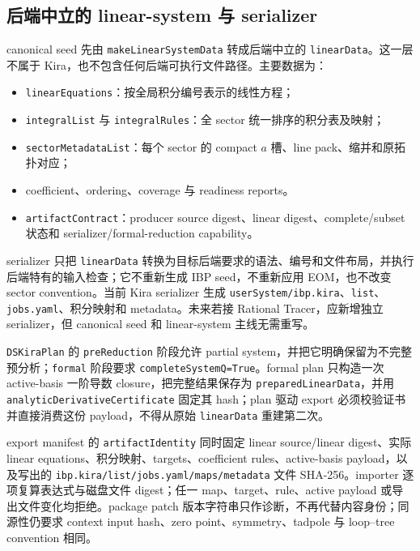 ﻿\documentclass[a4paper,11pt]{article}
\begin{document}
\subsection{后端中立的 linear-system 与 serializer}

canonical seed 先由 \texttt{makeLinearSystemData} 转成后端中立的 \texttt{linearData}。这一层不属于 Kira，也不包含任何后端可执行文件路径。主要数据为：
\begin{itemize}
  \item \texttt{linearEquations}：按全局积分编号表示的线性方程；
  \item \texttt{integralList} 与 \texttt{integralRules}：全 sector 统一排序的积分表及映射；
  \item \texttt{sectorMetadataList}：每个 sector 的 compact $a$ 槽、line pack、缩并和原拓扑对应；
  \item coefficient、ordering、coverage 与 readiness reports。
  \item \texttt{artifactContract}：producer source digest、linear digest、complete/subset 状态和 serializer/formal-reduction capability。
\end{itemize}

serializer 只把 \texttt{linearData} 转换为目标后端要求的语法、编号和文件布局，并执行后端特有的输入检查；它不重新生成 IBP seed，不重新应用 EOM，也不改变 sector convention。当前 Kira serializer 生成 \texttt{userSystem/ibp.kira}、\texttt{list}、\texttt{jobs.yaml}、积分映射和 metadata。未来若接 Rational Tracer，应新增独立 serializer，但 canonical seed 和 linear-system 主线无需重写。

\texttt{DSKiraPlan} 的 \texttt{preReduction} 阶段允许 partial system，并把它明确保留为不完整预分析；\texttt{formal} 阶段要求 \texttt{completeSystemQ=True}。formal plan 只构造一次 active-basis 一阶导数 closure，把完整结果保存为 \texttt{preparedLinearData}，并用 \texttt{analyticDerivativeCertificate} 固定其 hash；plan 驱动 export 必须校验证书并直接消费这份 payload，不得从原始 \texttt{linearData} 重建第二次。

export manifest 的 \texttt{artifactIdentity} 同时固定 linear source/linear digest、实际 linear equations、积分映射、targets、coefficient rules、active-basis payload，以及写出的 \texttt{ibp.kira/list/jobs.yaml/maps/metadata} 文件 SHA-256。importer 逐项复算表达式与磁盘文件 digest；任一 map、target、rule、active payload 或导出文件变化均拒绝。package patch 版本字符串只作诊断，不再代替内容身份；同源性仍要求 context input hash、zero point、symmetry、tadpole 与 loop--tree convention 相同。
\end{document}
